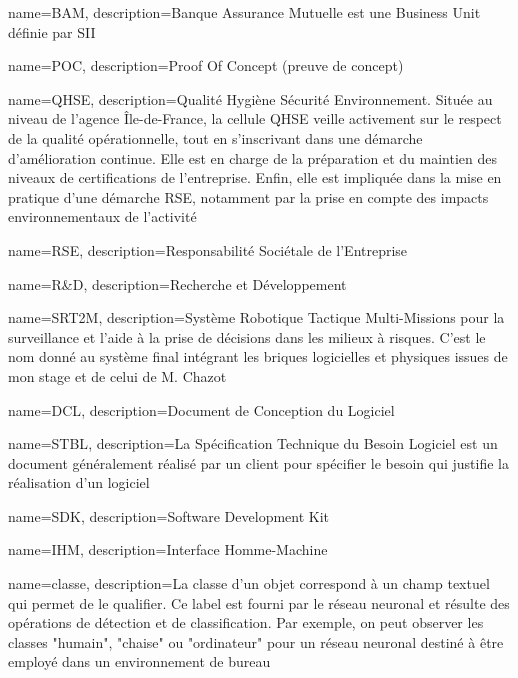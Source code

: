 {
  name={BAM},
    description={Banque Assurance Mutuelle est une Business Unit définie par SII}
}

{
  name={POC},
    description={Proof Of Concept (preuve de concept)}
}

{
  name={QHSE},
    description={Qualité Hygiène Sécurité Environnement. Située au niveau de l'agence \^{I}le-de-France, la cellule QHSE veille activement sur le respect de la qualité opérationnelle, tout en s'inscrivant dans une démarche d'amélioration continue. 
    Elle est en charge de la préparation et du maintien des niveaux de certifications de l'entreprise.
    Enfin, elle est impliquée dans la mise en pratique d'une démarche \gls{RSE}, notamment par la prise en compte des impacts environnementaux de l'activité}
}

{
  name={RSE},
    description={Responsabilité Sociétale de l'Entreprise}
}

{
  name={R\&D},
    description={Recherche et Développement}
}

{
  name={SRT2M},
    description={Système Robotique Tactique Multi-Missions pour la surveillance et l'aide à la prise de décisions dans les milieux à risques. 
    C'est le nom donné au système final intégrant les briques logicielles et physiques issues de mon stage et de celui de M. Chazot}
}

{
  name={DCL},
    description={Document de Conception du Logiciel}
}

{
  name={STBL},
    description={La Spécification Technique du Besoin Logiciel est un document généralement réalisé par un client pour spécifier le besoin qui justifie la réalisation d'un logiciel}
}

{
  name={SDK},
    description={Software Development Kit}
}

{
  name={IHM},
    description={Interface Homme-Machine}
}

{
  name={classe},
    description={La classe d'un objet correspond à un champ textuel qui permet de le qualifier. Ce label est fourni par le réseau neuronal et résulte des opérations de détection et de classification.
    Par exemple, on peut observer les classes "humain", "chaise" ou "ordinateur" pour un réseau neuronal destiné à être employé dans un environnement de bureau}
}

